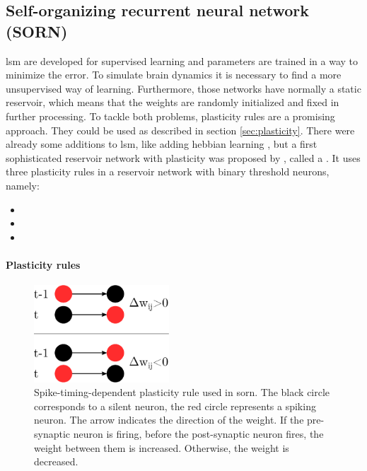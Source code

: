 \subsection{Self-organizing recurrent neural network (SORN)}
\label{sec:sorn}

\ac{lsm} are developed for supervised learning and parameters are trained in a way to minimize the error. To simulate brain dynamics it is necessary to find a more unsupervised way of learning. Furthermore, those networks have normally a static reservoir, which means that the weights are randomly initialized and fixed in further processing. To tackle both problems, plasticity rules are a promising approach. They could be used as described in section \ref{sec:plasticity}. There were already some additions to \acl{lsm}, like adding hebbian learning \parencite{norton2006preparing}, but a first sophisticated reservoir network with plasticity was proposed by \textcite{lazar2009sorn}, called a . It uses three plasticity rules in a reservoir network with binary threshold neurons, namely:

\begin{itemize}
\item {}
\item {}
\item {}
\end{itemize}

\paragraph{Plasticity rules}

\begin{figure}
	\centering
	\includegraphics[width=0.45\textwidth]{sorn_markov/stdp}
    \caption[Spike-timing-dependent plasticity rule used in \acs{sorn}.]{Spike-timing-dependent plasticity rule used in \acs{sorn}. The black circle corresponds to a silent neuron, the red circle represents a spiking neuron. The arrow indicates the direction of the weight. If the pre-synaptic neuron is firing, before the post-synaptic neuron fires, the weight between them is increased. Otherwise, the weight is decreased.}
    \label{fig:stdp-simple}
\end{figure}

